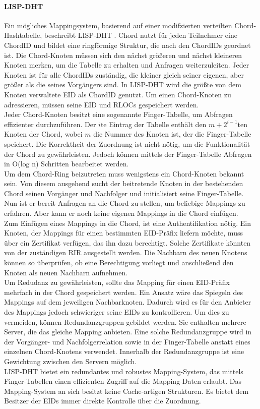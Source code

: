 \paragraph{LISP-DHT} 
Ein mögliches Mappingsystem, basierend auf einer modifzierten verteilten Chord-Hashtabelle, beschreibt LISP-DHT \cite{mathy:2008:dht}. Chord nutzt für jeden Teilnehmer eine ChordID und bildet eine ringförmige Struktur, die nach den ChordIDs geordnet ist. Die Chord-Knoten müssen sich den nächst größeren und nächst kleineren Knoten merken, um die Tabelle zu erhalten und Anfragen weiterzuleiten. Jeder Knoten ist für alle ChordIDs zuständig, die kleiner gleich seiner eigenen, aber größer als die seines Vorgängers sind. In LISP-DHT wird die größte von dem Knoten verwaltete EID als ChordID genutzt. Um einen Chord-Knoten zu adressieren, müssen seine EID und RLOCs gespeichert werden. \\
Jeder Chord-Knoten besitzt eine sogenannte Finger-Tabelle, um Abfragen effizienter durchzuführen. Der $i$te Eintrag der Tabelle enthält den $m+2^{i-1}$ten Knoten der Chord, wobei $m$ die Nummer des Knoten ist, der die Finger-Tabelle speichert. Die Korrektheit der Zuordnung ist nicht nötig, um die Funktionalität der Chord zu gewährleisten. Jedoch können mittels der Finger-Tabelle Abfragen in O(log n) Schritten bearbeitet werden. \\
Um  dem Chord-Ring beizutreten muss wenigstens ein Chord-Knoten bekannt sein. Von diesem ausgehend sucht der beitretende Knoten in der bestehenden Chord seinen Vorgänger und  Nachfolger und initialisiert seine Finger-Tabelle. Nun ist er bereit Anfragen an die Chord zu stellen, um beliebige Mappings zu erfahren. Aber kann er noch keine eigenen Mappings in die Chord einfügen. \\
Zum Einfügen eines Mappings in die Chord, ist eine Authentifikation nötig. Ein Knoten, der Mappings für einen bestimmten EID-Präfix liefern möchte, muss über ein Zertifikat verfügen, das ihn dazu berechtigt. Solche Zertifikate könnten von der zuständigen RIR ausgestellt werden. Die Nachbarn des neuen Knotens können so überprüfen, ob eine Berechtigung vorliegt und anschließend den Knoten als neuen Nachbarn aufnehmen. \\
Um Redudanz zu gewährleisten, sollte das Mapping für einen EID-Präfix mehrfach in der Chord gespeichert werden. Ein Ansatz wäre das Spiegeln des Mappings auf dem jeweiligen Nachbarknoten. Dadurch wird es für den Anbieter des Mappings jedoch schwieriger seine EIDs zu kontrollieren. Um dies zu vermeiden, können Redundanzgruppen gebildet werden. Sie enthalten mehrere Server, die das gleiche Mapping anbieten. Eine solche Redundanzgruppe wird in der Vorgänger- und Nachfolgerrelation sowie in der Finger-Tabelle anstatt eines einzelnen Chord-Knotens verwendet. Innerhalb der Redundanzgruppe ist eine Gewichtung zwischen den Servern möglich. \\
LISP-DHT bietet ein redundantes und robustes Mapping-System, das mittels Finger-Tabellen einen effizienten Zugriff auf die Mapping-Daten erlaubt. Das Mapping-System an sich besitzt keine Cache-artigen Strukturen. Es bietet dem Besitzer der EIDs immer direkte Kontrolle über die Zuordnung.




